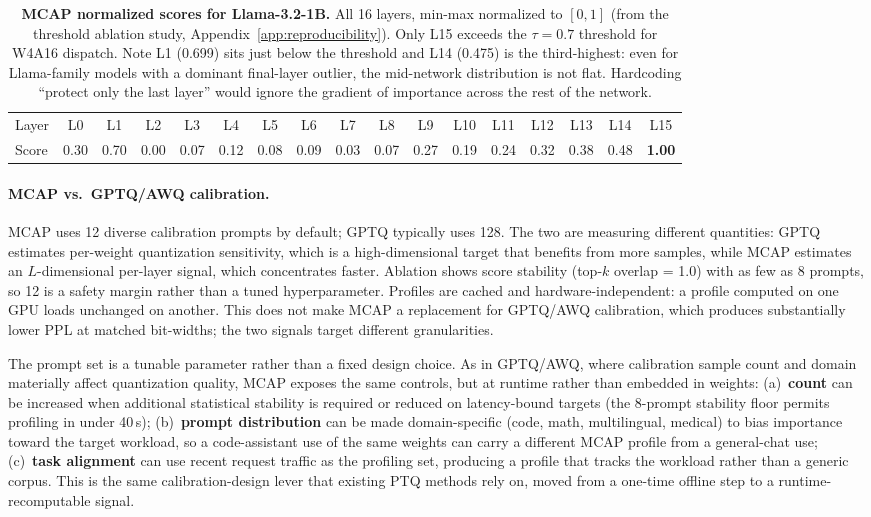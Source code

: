 \documentclass{article}
\begin{document}
\begin{table}[H]
\centering
\caption{\textbf{MCAP normalized scores for Llama-3.2-1B.} All 16 layers, min-max
normalized to $[0, 1]$ (from the threshold ablation study, Appendix~\ref{app:reproducibility}). Only L15 exceeds the
$\tau = 0.7$ threshold for W4A16 dispatch. Note L1 (0.699) sits just below the threshold
and L14 (0.475) is the third-highest: even for Llama-family models with a dominant
final-layer outlier, the mid-network distribution is not flat. Hardcoding ``protect only
the last layer'' would ignore the gradient of importance across the rest of the network.}
\label{tab:per_layer_scores}
\footnotesize
\setlength{\tabcolsep}{4pt}
\begin{tabular}{lcccccccccccccccc}
\toprule
Layer & L0 & L1 & L2 & L3 & L4 & L5 & L6 & L7 & L8 & L9 & L10 & L11 & L12 & L13 & L14 & L15 \\
Score & 0.30 & 0.70 & 0.00 & 0.07 & 0.12 & 0.08 & 0.09 & 0.03 & 0.07 & 0.27 & 0.19 & 0.24 & 0.32 & 0.38 & 0.48 & \textbf{1.00} \\
\bottomrule
\end{tabular}
\end{table}

\paragraph{MCAP vs.\ GPTQ/AWQ calibration.} MCAP uses 12 diverse calibration
prompts by default; GPTQ typically uses 128. The two are measuring different
quantities: GPTQ estimates per-weight quantization sensitivity, which is a
high-dimensional target that benefits from more samples, while MCAP
estimates an $L$-dimensional per-layer signal, which concentrates faster.
Ablation shows score stability (top-$k$ overlap = 1.0) with as few as 8
prompts, so 12 is a safety margin rather than a tuned hyperparameter.
Profiles are cached and hardware-independent: a profile computed on one GPU
loads unchanged on another. This does not make MCAP a replacement for
GPTQ/AWQ calibration, which produces substantially lower PPL at matched
bit-widths; the two signals target different granularities.

The prompt set is a tunable parameter rather than a fixed design choice. As in
GPTQ/AWQ, where calibration sample count and domain materially affect
quantization quality, MCAP exposes the same controls, but at runtime rather
than embedded in weights: (a)~\textbf{count} can be increased when additional
statistical stability is required or reduced on latency-bound targets (the
8-prompt stability floor permits profiling in under 40\,s); (b)~\textbf{prompt
distribution} can be made domain-specific (code, math, multilingual, medical)
to bias importance toward the target workload, so a code-assistant use of the
same weights can carry a different MCAP profile from a general-chat use;
(c)~\textbf{task alignment} can use recent request traffic as the profiling
set, producing a profile that tracks the workload rather than a generic
corpus. This is the same calibration-design lever that existing PTQ methods
rely on, moved from a one-time offline step to a runtime-recomputable signal.
\end{document}
